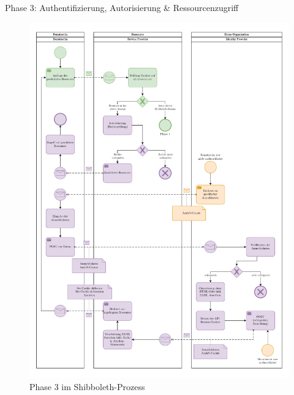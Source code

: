 \begin{frame}{Phase 3: Authentifizierung, Autorisierung \& Ressourcenzugriff}

    \begin{figure}
        \includegraphics[height=0.7\paperheight]{../assets/bis_bpmn_phase_3.drawio.pdf}
        \caption{Phase 3 im Shibboleth-Prozess~\cite[vgl.][]{switchExpertDemoSWITCHaai2024a}}
    \end{figure}
\end{frame}
